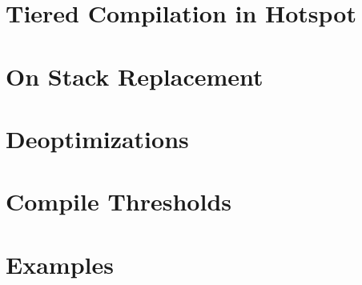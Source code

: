 \section{Tiered Compilation in Hotspot}

\section{On Stack Replacement}

\section{Deoptimizations}

\section{Compile Thresholds}

\section{Examples}
